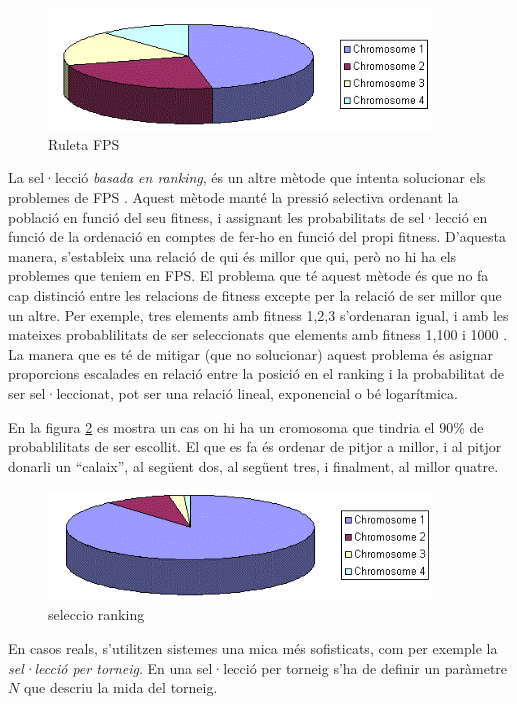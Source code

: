 \begin{figure} \centering \includegraphics[width=4in]{intro/rwsgraph.png}
\caption{\label{fig:rwsgraph}Ruleta FPS}
\end{figure}

La sel·lecció \emph{basada en ranking}, és un altre mètode que intenta
solucionar els problemes de FPS \cite{B87a}.  Aquest mètode manté la pressió
selectiva ordenant la població en funció del seu fitness, i assignant les
probabilitats de sel·lecció en funció de la ordenació en comptes de fer-ho en
funció del propi fitness. D'aquesta manera, s'estableix una relació de qui és
millor que qui, però no hi ha els problemes que teniem en FPS.  El problema que
té aquest mètode és que no fa cap distinció entre les relacions de fitness
excepte per la relació de ser millor que un altre.  Per exemple, tres elements
amb fitness 1,2,3 s'ordenaran igual, i amb les mateixes probablilitats de ser
seleccionats que elements amb fitness 1,100 i 1000 .  La manera que es té de
mitigar (que no solucionar) aquest problema és asignar proporcions escalades en
relació entre la posició en el ranking i la probabilitat de ser sel·leccionat,
pot ser una relació lineal, exponencial o bé logarítmica. 

En la figura \ref{fig:rank1} es mostra  un cas on hi ha un cromosoma que tindria
el 90\% de probablilitats de ser escollit. El que es fa és ordenar de pitjor a
millor, i al pitjor donarli un ``calaix'', al següent dos, al següent tres, i
finalment, al millor quatre. 

\begin{figure} \centering \includegraphics[width=4in]{intro/rank1.png}
\caption{\label{fig:rank1}seleccio ranking}
\end{figure}

En casos reals, s'utilitzen sistemes una mica més sofisticats, com per exemple
la \emph{sel·lecció per torneig}.  En una sel·lecció per torneig s'ha de definir
un paràmetre $N$ que descriu la mida del torneig.

